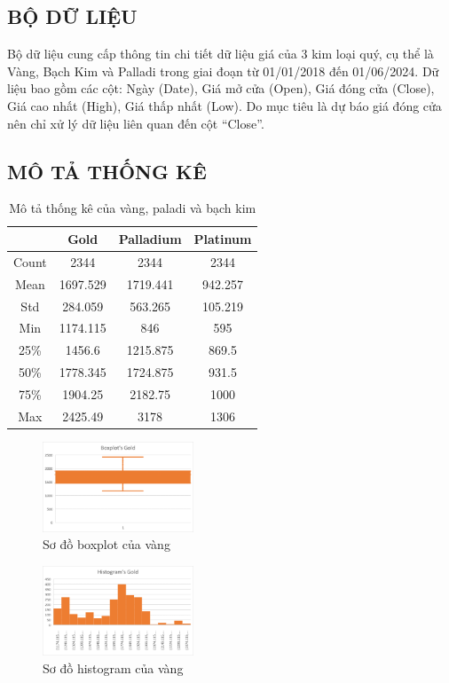 \subsection{BỘ DỮ LIỆU}
Bộ dữ liệu cung cấp thông tin chi tiết dữ liệu giá của 3 kim loại quý, cụ thể là Vàng, Bạch Kim và Palladi trong giai đoạn từ 01/01/2018 đến 01/06/2024. Dữ liệu bao gồm các cột: Ngày (Date), Giá mở cửa (Open), Giá đóng cửa (Close), Giá cao nhất (High), Giá thấp nhất (Low). Do mục tiêu là dự báo giá đóng cửa nên chỉ xử lý dữ liệu liên quan đến cột “Close”.

\subsection{MÔ TẢ THỐNG KÊ}
\begin{table}[htbp]
  \centering
\begin{tabular}{|c|c|c|c|}
    \hline
     \  & Gold & Palladium & Platinum \\ \hline
     Count & 2344 & 2344 & 2344\\ \hline
     Mean & 1697.529 & 1719.441 & 942.257\\ \hline
     Std & 284.059 & 563.265 & 105.219\\ \hline
     Min & 1174.115 & 846 & 595\\ \hline
     25\% & 1456.6 & 1215.875 & 869.5\\ \hline
     50\% & 1778.345 & 1724.875 & 931.5\\ \hline
     75\% & 1904.25 & 2182.75 & 1000\\ \hline
     Max & 2425.49 & 3178 & 1306\\ \hline
\end{tabular}
\caption{Mô tả thống kê của vàng, paladi và bạch kim}
\end{table}

\begin{figure}[htbp]
\centerline{\includegraphics[width=0.4\textwidth]{img/Picture2.png}}
\caption{Sơ đồ boxplot của vàng}
\label{fig}
\end{figure}

\begin{figure}[htbp]
\centerline{\includegraphics[width=0.4\textwidth]{img/Picture5.png}}
\caption{Sơ đồ histogram của vàng}
\label{fig}
\end{figure}

